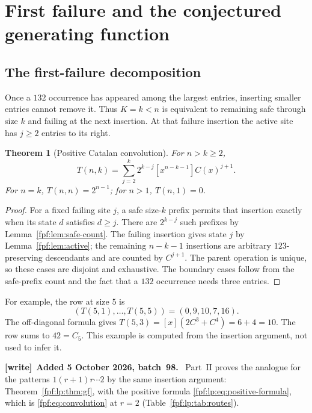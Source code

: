 \documentclass[11pt]{article}
\numberwithin{equation}{section}
\newtheorem{theorem}{Theorem}[section]
\theoremstyle{definition}
\newenvironment{writenote}[1][]{\par\smallskip\begingroup\small
 \noindent\textbf{[write]}\if\relax\detokenize{#1}\relax\else~\textbf{#1.}\fi\ }%
 {\par\endgroup\smallskip}
\begin{document}
\section{First failure and the conjectured generating function}\label{fpf:sec:first-failure}

\subsection{The first-failure decomposition}
Once a $132$ occurrence has appeared among the largest entries, inserting
smaller entries cannot remove it. Thus $K=k<n$ is equivalent to remaining
safe through size $k$ and failing at the next insertion. At that failure
insertion the active site has $j\ge2$ entries to its right.

\begin{theorem}[Positive Catalan convolution]\label{fpf:thm:convolution}
For $n>k\ge2$,
\begin{equation}\label{fpf:eq:convolution}
 T(n,k)=\sum_{j=2}^k 2^{k-j}[x^{n-k-1}]C(x)^{j+1}.
\end{equation}
For $n=k$, $T(n,n)=2^{n-1}$; for $n>1$, $T(n,1)=0$.
\end{theorem}
\begin{proof}
For a fixed failing site $j$, a safe size-$k$ prefix permits that insertion
exactly when its state $d$ satisfies $d\ge j$. There are $2^{k-j}$ such
prefixes by Lemma~\ref{fpf:lem:safe-count}. The failing insertion gives state
$j$ by Lemma~\ref{fpf:lem:active}; the remaining $n-k-1$ insertions are arbitrary
$123$-preserving descendants and are counted by $C^{j+1}$. The parent
operation is unique, so these cases are disjoint and exhaustive. The
boundary cases follow from the safe-prefix count and the fact that a
$132$ occurrence needs three entries.
\end{proof}

For example, the row at size $5$ is
\[
(T(5,1),\ldots,T(5,5))=(0,9,10,7,16).
\]
The off-diagonal formula gives $T(5,3)=[x](2C^3+C^4)=6+4=10$.
The row sums to $42=C_5$. This example is computed from the insertion
argument, not used to infer it.

\begin{writenote}[Added 5 October 2026, batch~98]
Part~II proves the analogue for the patterns $1(r+1)r\cdots2$ by the same
insertion argument: Theorem~\ref{fpf:lp:thm:gf}, with the positive formula
\eqref{fpf:lp:eq:positive-formula}, which is
\eqref{fpf:eq:convolution} at $r=2$ (Table~\ref{fpf:lp:tab:routes}).
\end{writenote}
\end{document}

